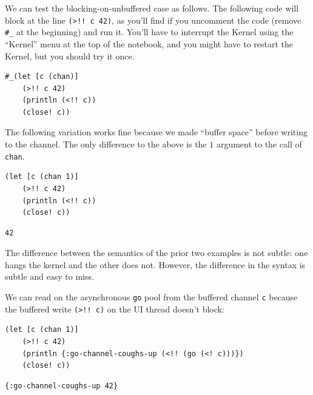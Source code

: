 \documentclass[10pt,oneside,x11names]{article}
\begin{document}
We can test the blocking-on-unbuffered case as follows. The following
code will block at the line \texttt{(>!! c 42)}, as you'll find if you
uncomment the code (remove \texttt{\#\_} at the beginning) and run it. You'll
have to interrupt the Kernel using the ``Kernel'' menu at the top of the
notebook, and you might have to restart the Kernel, but you should try
it once.

\begin{verbatim}
#_(let [c (chan)]
    (>!! c 42)
    (println (<!! c))
    (close! c))
\end{verbatim}

The following variation works fine because we made ``buffer space'' before
writing to the channel. The only difference to the above is the \(1\)
argument to the call of \texttt{chan}.

\begin{verbatim}
(let [c (chan 1)]
    (>!! c 42)
    (println (<!! c))
    (close! c))
\end{verbatim}

\begin{verbatim}
42
\end{verbatim}


The difference between the semantics of the prior two examples is not
subtle: one hangs the kernel and the other does not. However, the
difference in the syntax is subtle and easy to miss.

We can read on the asynchronous \texttt{go} pool from the buffered channel \texttt{c}
because the buffered write \texttt{(>!! c)} on the UI thread doesn't block:

\begin{verbatim}
(let [c (chan 1)]
    (>!! c 42)
    (println {:go-channel-coughs-up (<!! (go (<! c)))})
    (close! c))
\end{verbatim}

\begin{verbatim}
{:go-channel-coughs-up 42}
\end{verbatim}
\end{document}
